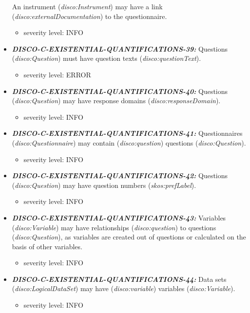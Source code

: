 \documentclass{llncs}
\begin{document}
\begin{itemize}
  An instrument (\emph{disco:Instrument}) may have a link (\emph{disco:externalDocumentation}) to the questionnaire.
	\begin{itemize}
		\item severity level: INFO
	\end{itemize}
	\item \textbf{{\em DISCO-C-EXISTENTIAL-QUANTIFICATIONS-39:}} 
  Questions (\emph{disco:Question}) must have question texts (\emph{disco:questionText}).
	\begin{itemize}
		\item severity level: ERROR
	\end{itemize}
	\item \textbf{{\em DISCO-C-EXISTENTIAL-QUANTIFICATIONS-40:}} 
  Questions (\emph{disco:Question}) may have response domains (\emph{disco:responseDomain}).
	\begin{itemize}
		\item severity level: INFO
	\end{itemize}
	\item \textbf{{\em DISCO-C-EXISTENTIAL-QUANTIFICATIONS-41:}} 
  Questionnaires (\emph{disco:Questionnaire}) may contain (\emph{disco:question}) questions (\emph{disco:Question}).
	\begin{itemize}
		\item severity level: INFO
	\end{itemize}
	\item \textbf{{\em DISCO-C-EXISTENTIAL-QUANTIFICATIONS-42:}} 
  Questions (\emph{disco:Question}) may have question numbers (\emph{skos:prefLabel}).
	\begin{itemize}
		\item severity level: INFO
	\end{itemize}
	\item \textbf{{\em DISCO-C-EXISTENTIAL-QUANTIFICATIONS-43:}} 
  Variables (\emph{disco:Variable}) may have relationships (\emph{disco:question}) to questions (\emph{disco:Question}), as variables are created out of questions or calculated on the basis of other variables.
	\begin{itemize}
		\item severity level: INFO
	\end{itemize}
	\item \textbf{{\em DISCO-C-EXISTENTIAL-QUANTIFICATIONS-44:}} 
  Data sets (\emph{disco:LogicalDataSet}) may have (\emph{disco:variable}) variables (\emph{disco:Variable}).
	\begin{itemize}
		\item severity level: INFO

\end{itemize}
\end{itemize}
\end{document}
